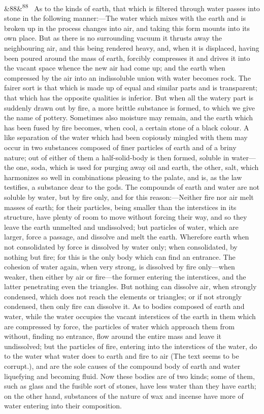 \documentclass[12pt]{article}
\newcommand{\para}[1][]{\par\noindent\ifx&#1&\else\textsuperscript{\footnotesize #1}~\fi}
\begin{document}
\para[88] As to the kinds of earth, that which is filtered through water passes into stone in the following manner:---The water which mixes with the earth and is broken up in the process changes into air, and taking this form mounts into its own place. But as there is no surrounding vacuum it thrusts away the neighbouring air, and this being rendered heavy, and, when it is displaced, having been poured around the mass of earth, forcibly compresses it and drives it into the vacant space whence the new air had come up; and the earth when compressed by the air into an indissoluble union with water becomes rock. The fairer sort is that which is made up of equal and similar parts and is transparent; that which has the opposite qualities is inferior. But when all the watery part is suddenly drawn out by fire, a more brittle substance is formed, to which we give the name of pottery. Sometimes also moisture may remain, and the earth which has been fused by fire becomes, when cool, a certain stone of a black colour. A like separation of the water which had been copiously mingled with them may occur in two substances composed of finer particles of earth and of a briny nature; out of either of them a half-solid-body is then formed, soluble in water---the one, soda, which is used for purging away oil and earth, the other, salt, which harmonizes so well in combinations pleasing to the palate, and is, as the law testifies, a substance dear to the gods. The compounds of earth and water are not soluble by water, but by fire only, and for this reason:---Neither fire nor air melt masses of earth; for their particles, being smaller than the interstices in its structure, have plenty of room to move without forcing their way, and so they leave the earth unmelted and undissolved; but particles of water, which are larger, force a passage, and dissolve and melt the earth. Wherefore earth when not consolidated by force is dissolved by water only; when consolidated, by nothing but fire; for this is the only body which can find an entrance. The cohesion of water again, when very strong, is dissolved by fire only---when weaker, then either by air or fire---the former entering the interstices, and the latter penetrating even the triangles. But nothing can dissolve air, when strongly condensed, which does not reach the elements or triangles; or if not strongly condensed, then only fire can dissolve it. As to bodies composed of earth and water, while the water occupies the vacant interstices of the earth in them which are compressed by force, the particles of water which approach them from without, finding no entrance, flow around the entire mass and leave it undissolved; but the particles of fire, entering into the interstices of the water, do to the water what water does to earth and fire to air (The text seems to be corrupt.), and are the sole causes of the compound body of earth and water liquefying and becoming fluid. Now these bodies are of two kinds; some of them, such as glass and the fusible sort of stones, have less water than they have earth; on the other hand, substances of the nature of wax and incense have more of water entering into their composition.
\end{document}
